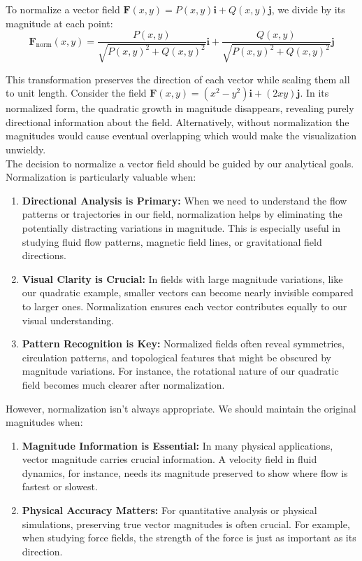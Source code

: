 \noindent To normalize a vector field $\mathbf{F}(x,y) = P(x,y)\mathbf{i} + Q(x,y)\mathbf{j}$, we divide by its magnitude at each point:
\[
\mathbf{F}_{\text{norm}}(x,y) = \frac{P(x,y)}{\sqrt{P(x,y)^2 + Q(x,y)^2}}\mathbf{i} + \frac{Q(x,y)}{\sqrt{P(x,y)^2 + Q(x,y)^2}}\mathbf{j}
\]

\noindent This transformation preserves the direction of each vector while scaling them all to unit length. Consider the field $\mathbf{F}(x,y) = (x^2-y^2)\mathbf{i} + (2xy)\mathbf{j}$. In its normalized form, the quadratic growth in magnitude disappears, revealing purely directional information about the field. Alternatively, without normalization the magnitudes would cause eventual overlapping which would make the visualization unwieldy.\\

\noindent The decision to normalize a vector field should be guided by our analytical goals. Normalization is particularly valuable when:

\begin{enumerate}
   \item \textbf{Directional Analysis is Primary:} When we need to understand the flow patterns or trajectories in our field, normalization helps by eliminating the potentially distracting variations in magnitude. This is especially useful in studying fluid flow patterns, magnetic field lines, or gravitational field directions.
   
   \item \textbf{Visual Clarity is Crucial:} In fields with large magnitude variations, like our quadratic example, smaller vectors can become nearly invisible compared to larger ones. Normalization ensures each vector contributes equally to our visual understanding.
   
   \item \textbf{Pattern Recognition is Key:} Normalized fields often reveal symmetries, circulation patterns, and topological features that might be obscured by magnitude variations. For instance, the rotational nature of our quadratic field becomes much clearer after normalization.
\end{enumerate}

\noindent However, normalization isn't always appropriate. We should maintain the original magnitudes when:

\begin{enumerate}
   \item \textbf{Magnitude Information is Essential:} In many physical applications, vector magnitude carries crucial information. A velocity field in fluid dynamics, for instance, needs its magnitude preserved to show where flow is fastest or slowest.
   
   \item \textbf{Physical Accuracy Matters:} For quantitative analysis or physical simulations, preserving true vector magnitudes is often crucial. For example, when studying force fields, the strength of the force is just as important as its direction.
\end{enumerate}

